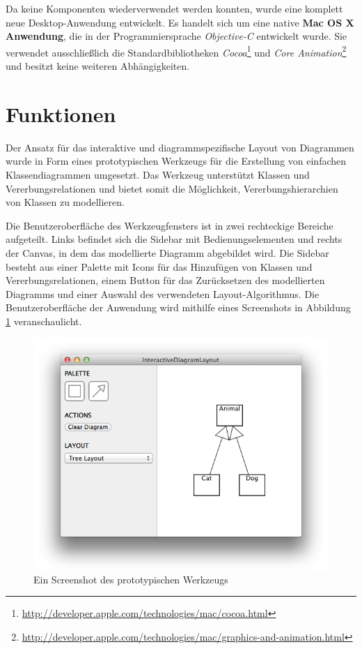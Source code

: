 Da keine Komponenten wiederverwendet werden konnten, wurde eine komplett neue Desktop-Anwendung entwickelt. Es handelt sich um eine native \textbf{Mac OS X Anwendung}, die in der Programmiersprache \textit{Objective-C} entwickelt wurde. Sie verwendet ausschließlich die Standardbibliotheken \textit{Cocoa}\footnote{\url{http://developer.apple.com/technologies/mac/cocoa.html}} und \textit{Core Animation}\footnote{\url{http://developer.apple.com/technologies/mac/graphics-and-animation.html}} und besitzt keine weiteren Abhängigkeiten.

\section{Funktionen}
\label{sec:functions}

Der Ansatz für das interaktive und diagrammspezifische Layout von Diagrammen wurde in Form eines prototypischen Werkzeugs für die Erstellung von einfachen Klassendiagrammen umgesetzt. Das Werkzeug unterstützt Klassen und Vererbungsrelationen und bietet somit die Möglichkeit, Vererbungshierarchien von Klassen zu modellieren.

Die Benutzeroberfläche des Werkzeugfensters ist in zwei rechteckige Bereiche aufgeteilt. Links befindet sich die Sidebar mit Bedienungselementen und rechts der Canvas, in dem das modellierte Diagramm abgebildet wird. Die Sidebar besteht aus einer Palette mit Icons für das Hinzufügen von Klassen und Vererbungsrelationen, einem Button für das Zurücksetzen des modellierten Diagramms und einer Auswahl des verwendeten Layout-Algorithmus. Die Benutzeroberfläche der Anwendung wird mithilfe eines Screenshots in Abbildung \ref{fig:prototype-screenshot} veranschaulicht.

\begin{figure}[hbt]
    \centering
    \includegraphics[scale=0.6]{assets/prototype-screenshot}
    \caption{Ein Screenshot des prototypischen Werkzeugs}
    \label{fig:prototype-screenshot}
\end{figure}

